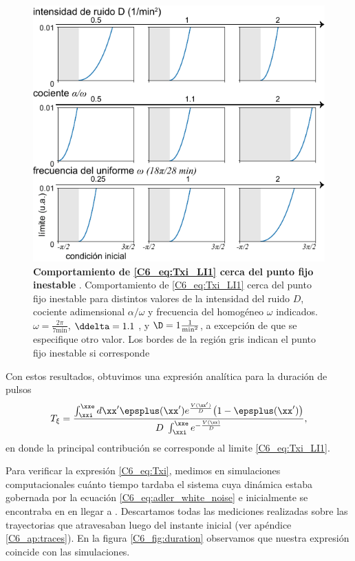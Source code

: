 {\begin{figure}
    \centering
    \includegraphics[width=1\columnwidth]{figures/chapter6/C6_limite_int_2.pdf} 
    \caption{\textbf{Comportamiento de \ref{C6_eq:Txi_LI1} cerca del punto fijo inestable \xxi}. Comportamiento de \ref{C6_eq:Txi_LI1} cerca del punto fijo inestable \xxi para distintos valores de la intensidad del ruido $D$, cociente adimensional $\alpha/\omega$ y frecuencia del homogéneo $\omega$ indicados. $\omega = \frac{2\pi}{7 \text{min}}$, $\ddelta = 1.1$ , y $\D = 1 \frac{1}{\text{min}^2}$, a excepción de que se especifique otro valor. Los bordes de la región gris indican el punto fijo inestable si corresponde}
    \label{C6_fig:Txi_LI2_S2}
\end{figure}

Con estos resultados, obtuvimos una expresión analítica para la duración de pulsos
\begin{align}
     T_\xi = \frac{\int_{\xxi}^{\xxe} d \xx' \epsplus(\xx') e^{ \frac{V(\xx')}{D}} \big(1 - \epsplus(\xx') \big)}{D\; \int_{\xxi}^{\xxe} e^{- \frac{V(\xx)}{D}}},
     \label{C6_eq:Txi}
\end{align}
en donde la principal contribución se corresponde al limite \ref{C6_eq:Txi_LI1}.

Para verificar la expresión \ref{C6_eq:Txi}, medimos en simulaciones computacionales cuánto tiempo tardaba el sistema cuya dinámica estaba gobernada por la ecuación \ref{C6_eq:adler_white_noise} e inicialmente se encontraba en \xxi en llegar a \xxe. Descartamos todas las mediciones realizadas sobre las trayectorias que atravesaban \xxi luego del instante inicial (ver apéndice \ref{C6_ap:traces}). En la figura \ref{C6_fig:duration} observamos que nuestra expresión coincide con las simulaciones. 


}
